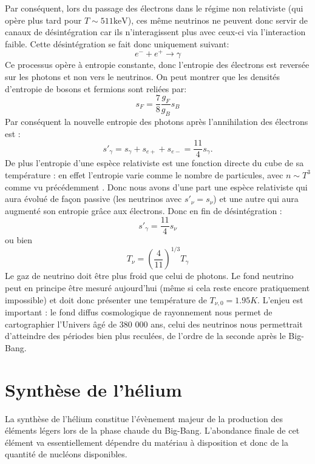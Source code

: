 Par conséquent, lors du passage des électrons dans le régime non relativiste (qui opère plus tard pour $T\sim 511 \mathrm{keV}$), ces même neutrinos ne peuvent donc servir de canaux de désintégration car ils n'interagissent plus avec ceux-ci via l'interaction faible. Cette désintégration se fait donc uniquement suivant:
\begin{equation}
e^-+e^+\rightarrow \gamma
\end{equation}
Ce processus opère à entropie constante, donc l'entropie des électrons est reversée sur les photons et non vers le neutrinos. On peut montrer que les densités d'entropie de bosons et fermions sont reliées par:
\begin{equation}
s_F=\frac{7}{8}\frac{g_F}{g_B} s_B
\end{equation}
Par conséquent la nouvelle entropie des photons après l'annihilation des électrons est :
\begin{equation}
s'_\gamma=s_\gamma+s_{e+}+s_{e-}=\frac{11}{4}s_\gamma.
\end{equation}
De plus l'entropie d'une espèce relativiste est une fonction directe du cube de sa température : en effet l'entropie varie comme le nombre de particules, avec $n\sim T^3$ comme vu précédemment . Donc nous avons d'une part une espèce relativiste qui aura évolué de façon passive  (les neutrinos avec $s'_\nu=s_\nu$) et une autre qui aura augmenté son entropie grâce aux électrons. Donc en fin de désintégration :
\begin{equation}
s'_\gamma=\frac{11}{4} s_\nu
\end{equation}
ou bien
\begin{equation}
T_\nu=\left(\frac{4}{11}\right)^{1/3} T_\gamma
\end{equation}
Le gaz de neutrino doit être plus froid que celui de photons. Le fond neutrino peut en principe être mesuré aujourd'hui (même si cela reste encore pratiquement impossible) et doit donc présenter une température de  $T_{\nu,0}=1.95 K$. L'enjeu est important : le fond diffus cosmologique de rayonnement nous permet de cartographier l'Univers âgé de 380 000 ans, celui des neutrinos nous permettrait d'atteindre des périodes bien plus reculées, de l'ordre de la seconde après le Big-Bang.

\section{Synthèse de l'hélium}
La synthèse de l'hélium constitue l'évènement majeur de la production des éléments légers lors de la phase chaude du Big-Bang. L'abondance finale de cet élément va essentiellement dépendre du matériau à disposition et donc de la quantité de nucléons disponibles.

